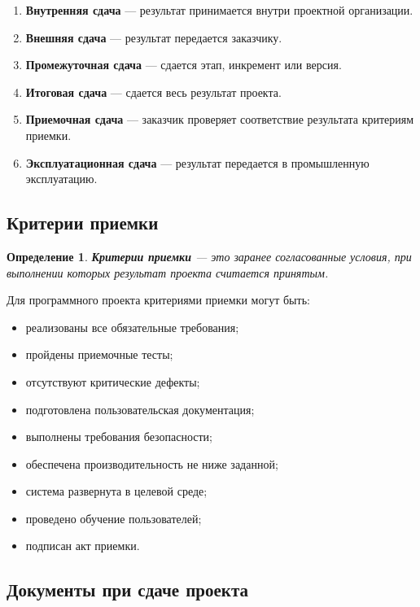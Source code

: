 \documentclass[12pt,a4paper]{article}
\newtheorem{definition}{Определение}
\begin{document}
\begin{enumerate}
    \item \textbf{Внутренняя сдача} --- результат принимается внутри проектной организации.
    \item \textbf{Внешняя сдача} --- результат передается заказчику.
    \item \textbf{Промежуточная сдача} --- сдается этап, инкремент или версия.
    \item \textbf{Итоговая сдача} --- сдается весь результат проекта.
    \item \textbf{Приемочная сдача} --- заказчик проверяет соответствие результата критериям приемки.
    \item \textbf{Эксплуатационная сдача} --- результат передается в промышленную эксплуатацию.
\end{enumerate}

\subsection{Критерии приемки}

\begin{definition}
\textbf{Критерии приемки} --- это заранее согласованные условия, при выполнении которых результат проекта считается принятым.
\end{definition}

Для программного проекта критериями приемки могут быть:
\begin{itemize}
    \item реализованы все обязательные требования;
    \item пройдены приемочные тесты;
    \item отсутствуют критические дефекты;
    \item подготовлена пользовательская документация;
    \item выполнены требования безопасности;
    \item обеспечена производительность не ниже заданной;
    \item система развернута в целевой среде;
    \item проведено обучение пользователей;
    \item подписан акт приемки.
\end{itemize}

\subsection{Документы при сдаче проекта}
\end{document}
